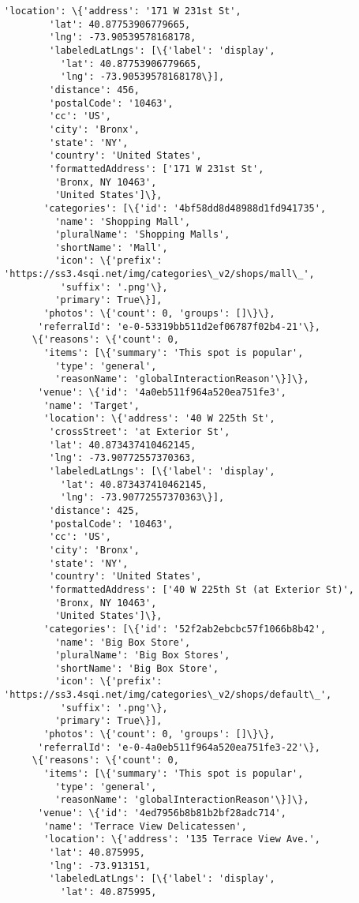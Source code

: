 \documentclass[11pt]{article}
\begin{document}
\begin{tcolorbox}[breakable, size=fbox, boxrule=.5pt, pad at break*=1mm, opacityfill=0]
\begin{Verbatim}[commandchars=\\\{\}]
       'location': \{'address': '171 W 231st St',
        'lat': 40.87753906779665,
        'lng': -73.90539578168178,
        'labeledLatLngs': [\{'label': 'display',
          'lat': 40.87753906779665,
          'lng': -73.90539578168178\}],
        'distance': 456,
        'postalCode': '10463',
        'cc': 'US',
        'city': 'Bronx',
        'state': 'NY',
        'country': 'United States',
        'formattedAddress': ['171 W 231st St',
         'Bronx, NY 10463',
         'United States']\},
       'categories': [\{'id': '4bf58dd8d48988d1fd941735',
         'name': 'Shopping Mall',
         'pluralName': 'Shopping Malls',
         'shortName': 'Mall',
         'icon': \{'prefix':
'https://ss3.4sqi.net/img/categories\_v2/shops/mall\_',
          'suffix': '.png'\},
         'primary': True\}],
       'photos': \{'count': 0, 'groups': []\}\},
      'referralId': 'e-0-53319bb511d2ef06787f02b4-21'\},
     \{'reasons': \{'count': 0,
       'items': [\{'summary': 'This spot is popular',
         'type': 'general',
         'reasonName': 'globalInteractionReason'\}]\},
      'venue': \{'id': '4a0eb511f964a520ea751fe3',
       'name': 'Target',
       'location': \{'address': '40 W 225th St',
        'crossStreet': 'at Exterior St',
        'lat': 40.873437410462145,
        'lng': -73.90772557370363,
        'labeledLatLngs': [\{'label': 'display',
          'lat': 40.873437410462145,
          'lng': -73.90772557370363\}],
        'distance': 425,
        'postalCode': '10463',
        'cc': 'US',
        'city': 'Bronx',
        'state': 'NY',
        'country': 'United States',
        'formattedAddress': ['40 W 225th St (at Exterior St)',
         'Bronx, NY 10463',
         'United States']\},
       'categories': [\{'id': '52f2ab2ebcbc57f1066b8b42',
         'name': 'Big Box Store',
         'pluralName': 'Big Box Stores',
         'shortName': 'Big Box Store',
         'icon': \{'prefix':
'https://ss3.4sqi.net/img/categories\_v2/shops/default\_',
          'suffix': '.png'\},
         'primary': True\}],
       'photos': \{'count': 0, 'groups': []\}\},
      'referralId': 'e-0-4a0eb511f964a520ea751fe3-22'\},
     \{'reasons': \{'count': 0,
       'items': [\{'summary': 'This spot is popular',
         'type': 'general',
         'reasonName': 'globalInteractionReason'\}]\},
      'venue': \{'id': '4ed7956b8b81b2bf28adc714',
       'name': 'Terrace View Delicatessen',
       'location': \{'address': '135 Terrace View Ave.',
        'lat': 40.875995,
        'lng': -73.913151,
        'labeledLatLngs': [\{'label': 'display',
          'lat': 40.875995,

\end{Verbatim}
\end{tcolorbox}
\end{document}

